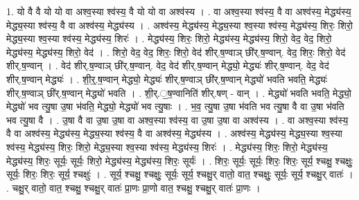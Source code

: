 \documentclass[17pt]{extarticle}
\begin{document}
1. यो वै वै यो यो वा अश्व॒स्या श्व॑स्य॒ वै यो यो वा अश्व॑स्य । . वा अश्व॒स्या श्व॑स्य॒ वै वा अश्व॑स्य॒ मेद्ध्य॑स्य॒ मेद्ध्य॒स्या श्व॑स्य॒ वै वा अश्व॑स्य॒ मेद्ध्य॑स्य । . अश्व॑स्य॒ मेद्ध्य॑स्य॒ मेद्ध्य॒स्या श्व॒स्या श्व॑स्य॒ मेद्ध्य॑स्य॒ शिरः॒ शिरो॒ मेद्ध्य॒स्या श्व॒स्या श्व॑स्य॒ मेद्ध्य॑स्य॒ शिरः॑ । . मेद्ध्य॑स्य॒ शिरः॒ शिरो॒ मेद्ध्य॑स्य॒ मेद्ध्य॑स्य॒ शिरो॒ वेद॒ वेद॒ शिरो॒ मेद्ध्य॑स्य॒ मेद्ध्य॑स्य॒ शिरो॒ वेद॑ । . शिरो॒ वेद॒ वेद॒ शिरः॒ शिरो॒ वेद॑ शीर्.ष॒ण्वाञ् छी॑र्.ष॒ण्वान्. वेद॒ शिरः॒ शिरो॒ वेद॑ शीर्.ष॒ण्वान् । . वेद॑ शीर्.ष॒ण्वाञ् छी॑र्.ष॒ण्वान्. वेद॒ वेद॑ शीर्.ष॒ण्वान् मेद्ध्यो॒ मेद्ध्यः॑ शीर्.ष॒ण्वान्. वेद॒ वेद॑ शीर्.ष॒ण्वान् मेद्ध्यः॑ । . शी॒र्॒.ष॒ण्वान् मेद्ध्यो॒ मेद्ध्यः॑ शीर्.ष॒ण्वाञ् छी॑र्.ष॒ण्वान् मेद्ध्यो॑ भवति भवति॒ मेद्ध्यः॑ शीर्.ष॒ण्वाञ् छी॑र्.ष॒ण्वान् मेद्ध्यो॑ भवति । . शी॒र्.॒ष॒ण्वानिति॑ शीर्.षण् - वान् । . मेद्ध्यो॑ भवति भवति॒ मेद्ध्यो॒ मेद्ध्यो॑ भव त्यु॒षा उ॒षा भ॑वति॒ मेद्ध्यो॒ मेद्ध्यो॑ भव त्यु॒षाः । . भ॒व॒ त्यु॒षा उ॒षा भ॑वति भव त्यु॒षा वै वा उ॒षा भ॑वति भव त्यु॒षा वै । . उ॒षा वै वा उ॒षा उ॒षा वा अश्व॒स्या श्व॑स्य॒ वा उ॒षा उ॒षा वा अश्व॑स्य । . वा अश्व॒स्या श्व॑स्य॒ वै वा अश्व॑स्य॒ मेद्ध्य॑स्य॒ मेद्ध्य॒स्या श्व॑स्य॒ वै वा अश्व॑स्य॒ मेद्ध्य॑स्य । . अश्व॑स्य॒ मेद्ध्य॑स्य॒ मेद्ध्य॒स्या श्व॒स्या श्व॑स्य॒ मेद्ध्य॑स्य॒ शिरः॒ शिरो॒ मेद्ध्य॒स्या श्व॒स्या श्व॑स्य॒ मेद्ध्य॑स्य॒ शिरः॑ । . मेद्ध्य॑स्य॒ शिरः॒ शिरो॒ मेद्ध्य॑स्य॒ मेद्ध्य॑स्य॒ शिरः॒ सूर्यः॒ सूर्यः॒ शिरो॒ मेद्ध्य॑स्य॒ मेद्ध्य॑स्य॒ शिरः॒ सूर्यः॑ । . शिरः॒ सूर्यः॒ सूर्यः॒ शिरः॒ शिरः॒ सूर्य॒ श्चक्षु॒ श्चक्षुः॒ सूर्यः॒ शिरः॒ शिरः॒ सूर्य॒ श्चक्षुः॑ । . सूर्य॒ श्चक्षु॒ श्चक्षुः॒ सूर्यः॒ सूर्य॒ श्चक्षु॒र् वातो॒ वात॒ श्चक्षुः॒ सूर्यः॒ सूर्य॒ श्चक्षु॒र् वातः॑ । . चक्षु॒र् वातो॒ वात॒ श्चक्षु॒ श्चक्षु॒र् वातः॑ प्रा॒णः प्रा॒णो वात॒ श्चक्षु॒ श्चक्षु॒र् वातः॑ प्रा॒णः । \newline
\end{document}
